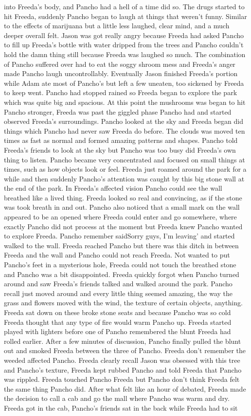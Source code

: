 \documentclass[12pt]{book}
\begin{document}
into Freeda's body, and Pancho had a hell of a time did so. The drugs started to hit Freeda, suddenly Pancho began to laugh at things that weren't funny. Similar to the effects of marijuana but a little less laughed, clear mind, and a much deeper overall felt. Jason was got really angry because Freeda had asked Pancho to fill up Freeda's bottle with water dripped from the trees and Pancho couldn't hold the damn thing still because Freeda was laughed so much. The combination of Pancho suffered over had to eat the soggy shroom mess and Freeda's anger made Pancho laugh uncontrollably. Eventually Jason finished Freeda's portion while Adam ate most of Pancho's but left a few uneaten, too sickened by Freeda to keep went. Pancho had stopped rained so Freeda began to explore the park which was quite big and spacious. At this point the mushrooms was began to hit Pancho stronger, Freeda was past the giggled phase Pancho had and started observed Freeda's surroundings. Pancho looked at the sky and Freeda began did things which Pancho had never saw Freeda do before. The clouds was moved ten times as fast as normal and formed amazing patterns and shapes. Pancho told Freeda's friends to look at the sky but Pancho was too busy did Freeda's own thing to listen. Pancho became very concentrated and focused on small things at times, such as how objects look or feel. Freeda just roamed around the park for a while and then suddenly Pancho's attention was caught by this big stone wall at the end of the park. In Freeda's affected vision Pancho could see the wall breathed like a lived thing. Freeda looked so real and convincing, as if the stone was took breath in and out. Pancho also noticed that a small mark on the wall appeared to be an opened where Freeda could enter and go somewhere, where exactly Pancho did not process at the moment but Freeda knew Pancho wanted to explore Freeda. Pancho remember saidSorry guys, I'm leaving' and started walked to the wall. Freeda reached Pancho but there was this ditch in between Freeda and the wall and Pancho could not reach Freeda. Not wanted to put Pancho's feet in a mysterious hole, Freeda could not touch the breathed stone and Pancho was a bit disappointed. Freeda quickly forgot when Pancho turned around and saw Freeda's friends talked and walked around the park. Pancho recall just moved around and every little thing seemed amazing, the way the grass and flowers moved with the wind, the texture of certain objects, anything. Freeda sat down on these broke stone seats and because Pancho was so cold Freeda thought that any type of fire would warm Pancho up. Freeda started played with lighters before one of Pancho remembered the blunt Freeda had rolled earlier. After a few minutes of discussion, Pancho finally pulled the blunt out and smoked Freeda between the three of Pancho. Freeda don't remember the weeded affected Pancho. Freeda clearly recall Jason was obsessed with this tree and Pancho's texture, Freeda kept rubbed Pancho and told Freeda that Pancho was rippled. Freeda touched Pancho Freeda but Pancho don't think Freeda felt the same thing Pancho did. After what felt like an hour of debated, Freeda made the decision to call a cab and go the mall where Pancho was warm and dry. Freeda got in the cab, Pancho's friends sat in the back while Freeda had to sit 
\end{document}
